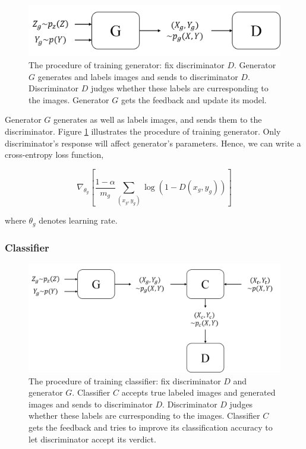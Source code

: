 \documentclass[conference]{IEEEtran}
\begin{document}
\begin{figure}
\centering
\includegraphics[scale=0.35]{pics/3.png}
\caption{The procedure of training generator: fix discriminator $D$. Generator $G$ generates and labels images and sends to discriminator $D$. Discriminator $D$ judges whether these labels are curresponding to the images. Generator $G$ gets the feedback and update its model. }
\label{f3}
\end{figure}

Generator $G$ generates as well as labels images, and sends them to the discriminator. Figure \ref{f3} illustrates the procedure of training generator. Only discriminator's response will affect generator's parameters. Hence, we can write a cross-entropy loss function,

\begin{equation}
\nabla_{\theta_g} \left[\frac{1 - \alpha}{m_g} \sum\limits_{(x_g, y_g)} \log(1 - D(x_g, y_g))\right]
\label{eq3}
\end{equation}

where $\theta_g$ denotes learning rate. 

\subsubsection{Classifier}

\begin{figure}
\centering
\includegraphics[scale=0.35]{pics/2.png}
\caption{The procedure of training classifier: fix discriminator $D$ and generator $G$. Classifier $C$ accepts true labeled images and generated images and sends to discriminator $D$. Discriminator $D$ judges whether these labels are curresponding to the images. Classifier $C$ gets the feedback and tries to improve its classification accuracy to let discriminator accept its verdict.}
\label{f2}
\end{figure}
\end{document}

